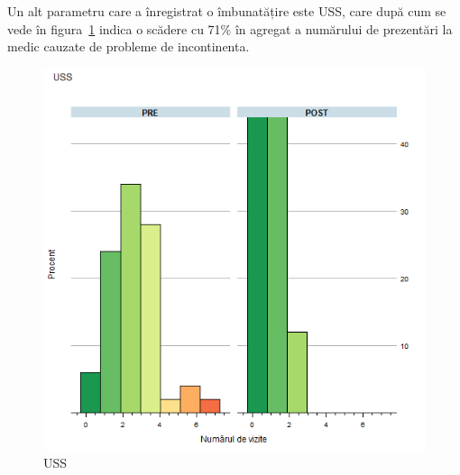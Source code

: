 \documentclass[12pt,draft]{article}
\begin{document}
  Un alt parametru care a înregistrat o îmbunatățire este \acf{USS}, care după cum se vede în figura~\ref{fig:incoResUSS} indica o scădere cu 71\% în agregat a numărului de prezentări la medic cauzate de probleme de incontinenta.
  \begin{figure}[H]
    \centering
    \includegraphics[width=0.8\linewidth]{incoResUSS}
    \caption{\acf{USS}}
    \label{fig:incoResUSS}
  \end{figure}
  
\end{document}
